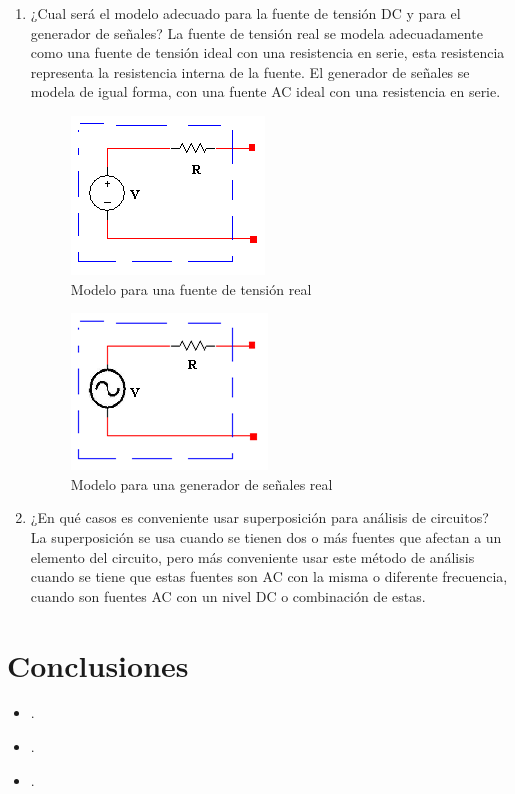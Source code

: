 \documentclass[twocolumn]{IEEEtran}
\begin{document}
\begin{enumerate}
 \item ¿Cual será el modelo adecuado para la fuente de tensión DC y para el generador de señales?
La fuente de tensión real se modela adecuadamente como una fuente de tensión ideal con una resistencia en serie, esta resistencia representa la resistencia interna de la fuente. El generador de señales se modela de igual forma, con una fuente AC ideal  con una resistencia en serie.
\begin{figure}[H]
	\centering
		\includegraphics[scale=0.9]{p1.png}
	\caption{Modelo para una fuente de tensión real}
	\label{fig10}
\end{figure}
\begin{figure}[H]
	\centering
		\includegraphics[scale=0.9]{p11.png}
	\caption{Modelo para una generador de señales real}
	\label{fig11}
\end{figure}

 \item ¿En qué casos es conveniente usar superposición para análisis de circuitos?\\
La superposición se usa cuando se tienen dos o más fuentes que afectan a un elemento del circuito, pero más conveniente usar este método de análisis cuando se tiene que estas fuentes son AC con la misma o diferente frecuencia, cuando son fuentes AC con un nivel DC o combinación de estas.
\end{enumerate}

\section{Conclusiones}
\begin{itemize}
 \item .
 \item .
 \item .
\end{itemize}
\end{document}
